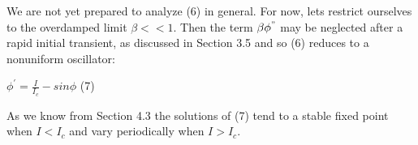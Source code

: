 \documentclass{article}
\newcommand\tab[1][1cm]{\hspace*{#1}}
\begin{document}
We are not yet prepared to analyze (6) in general. For now, lets restrict ourselves to the overdamped limit $\beta << 1$. Then the term $\beta \phi^{"}$ may be neglected after a rapid initial transient, as discussed in Section 3.5 and so (6) reduces to a nonuniform oscillator:
\begin{center}
$\phi^{'}=\frac{I}{I_{c}}-sin \phi$ \tab (7)
\end{center}

As we know from Section 4.3 the solutions of (7) tend to a stable fixed point when $I<I_{c}$ and vary periodically when $I>I_{c}$.
\end{document}
